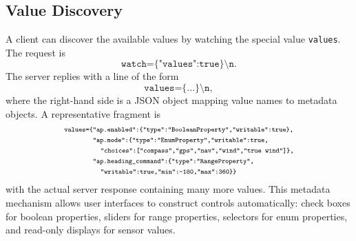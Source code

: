 \documentclass[11pt,twocolumn]{article}
\begin{document}
\subsection{Value Discovery}
A client can discover the available values by watching the special value
\texttt{values}.  The request is
\[
\texttt{watch=\{"values":true\}\textbackslash n}.
\]
The server replies with a line of the form
\[
\texttt{values=\{...\}\textbackslash n},
\]
where the right-hand side is a JSON object mapping value names to metadata
objects.  A representative fragment is
\[
\scriptsize
\begin{aligned}
\texttt{values=\{}&
\texttt{"ap.enabled":\{"type":"BooleanProperty","writable":true\},}\\
&
\texttt{"ap.mode":\{"type":"EnumProperty","writable":true,}\\
&\quad
\texttt{"choices":["compass","gps","nav","wind","true wind"]\},}\\
&
\texttt{"ap.heading\_command":\{"type":"RangeProperty",}\\
&\quad
\texttt{"writable":true,"min":-180,"max":360\}\}}
\end{aligned}
\]
with the actual server response containing many more values.  This
metadata mechanism allows user interfaces to construct controls
automatically: check boxes for boolean properties, sliders for range
properties, selectors for enum properties, and read-only displays for
sensor values.
\end{document}
